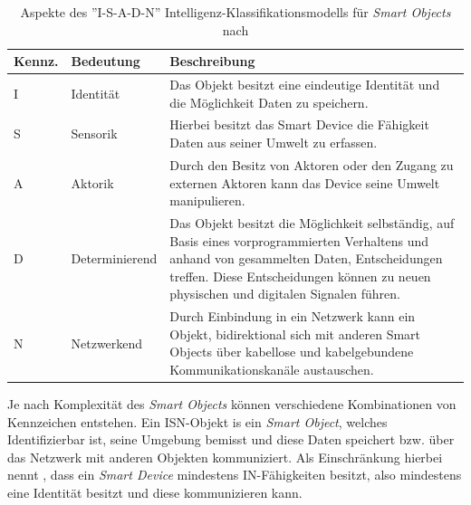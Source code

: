 \begin{table}[H]
\centering
\label{tab:isadnKennz}
\begin{tabularx}{\textwidth}{llX}
\hline
\rowcolor[HTML]{EFEFEF} 
Kennz. & Bedeutung & Beschreibung \\ \hline
I      & Identität      & Das Objekt besitzt eine eindeutige Identität und die Möglichkeit Daten zu speichern. \\ \hline
S      & Sensorik       & Hierbei besitzt das Smart Device die Fähigkeit Daten aus seiner Umwelt zu erfassen. \\ \hline
A      & Aktorik        & Durch den Besitz von Aktoren oder den Zugang zu externen Aktoren kann das Device seine Umwelt manipulieren. \\ \hline
D      & Determinierend & Das Objekt besitzt die Möglichkeit selbständig, auf Basis eines vorprogrammierten Verhaltens und anhand von gesammelten Daten, Entscheidungen treffen. Diese Entscheidungen können zu neuen physischen und digitalen Signalen führen. \\ \hline
N      & Netzwerkend   & Durch Einbindung in ein Netzwerk kann ein Objekt, bidirektional sich mit anderen Smart Objects über kabellose und kabelgebundene Kommunikationskanäle austauschen. \\ \hline                                                        
\end{tabularx}
\caption{Aspekte des ''I-S-A-D-N'' Intelligenz-Klassifikationsmodells für \textit{Smart Objects} nach \cite{lopez2011taxonomy} }
\end{table}

Je nach Komplexität des \textit{Smart Objects} können verschiedene Kombinationen von Kennzeichen entstehen. Ein ISN-Objekt is ein \textit{Smart Object}, welches Identifizierbar ist, seine Umgebung bemisst und diese Daten speichert bzw. über das Netzwerk mit anderen Objekten kommuniziert. Als Einschränkung hierbei nennt \cite{lopez2011taxonomy}, dass ein \textit{Smart Device} mindestens IN-Fähigkeiten besitzt, also mindestens eine Identität besitzt und diese kommunizieren kann.


